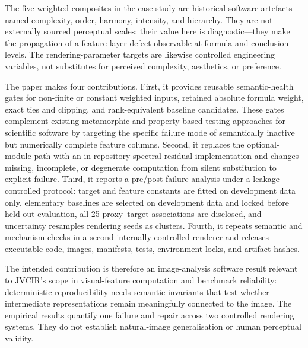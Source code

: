 The five weighted composites in the case study are historical software artefacts named complexity, order, harmony, intensity, and hierarchy. They are not externally sourced perceptual scales; their value here is diagnostic---they make the propagation of a feature-layer defect observable at formula and conclusion levels. The rendering-parameter targets are likewise controlled engineering variables, not substitutes for perceived complexity, aesthetics, or preference.

The paper makes four contributions. First, it provides reusable semantic-health gates for non-finite or constant weighted inputs, retained absolute formula weight, exact ties and clipping, and rank-equivalent baseline candidates. These gates complement existing metamorphic and property-based testing approaches for scientific software by targeting the specific failure mode of semantically inactive but numerically complete feature columns. Second, it replaces the optional-module path with an in-repository spectral-residual implementation and changes missing, incomplete, or degenerate computation from silent substitution to explicit failure. Third, it reports a pre/post failure analysis under a leakage-controlled protocol: target and feature constants are fitted on development data only, elementary baselines are selected on development data and locked before held-out evaluation, all 25 proxy--target associations are disclosed, and uncertainty resamples rendering seeds as clusters. Fourth, it repeats semantic and mechanism checks in a second internally controlled renderer and releases executable code, images, manifests, tests, environment locks, and artifact hashes.

The intended contribution is therefore an image-analysis software result relevant to JVCIR's scope in visual-feature computation and benchmark reliability: deterministic reproducibility needs semantic invariants that test whether intermediate representations remain meaningfully connected to the image. The empirical results quantify one failure and repair across two controlled rendering systems. They do not establish natural-image generalisation or human perceptual validity.

